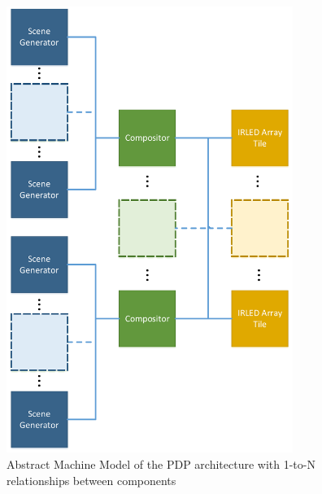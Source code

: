\begin{figure}
    \centering
        \centering
        \includegraphics[width=0.83\textwidth]{fig/amm.pdf}
        \caption{Abstract Machine Model of the PDP architecture with 1-to-N relationships between components}
        \label{fig:amm}
\end{figure}


